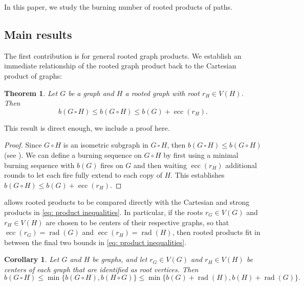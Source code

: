 \documentclass{article}
\newtheorem{theorem}{Theorem}
\newtheorem{corollary}{Corollary}
\begin{document}
In this paper, we study the burning number of rooted products of paths.



\subsection{Main results}
The first contribution is for general rooted graph products. We establish an immediate relationship of the rooted graph product back to the Cartesian product of graphs:

\begin{theorem}\label{thm: rooted ineq}
    Let $G$ be a graph and $H$ a rooted graph with root $r_H \in V(H)$. Then
    \[
    b(G \, \square \, H) \le b(G \circ H) \le b(G) + \operatorname{ecc}(r_H).
    \]
\end{theorem}

This result is direct enough, we include a proof here. 

\begin{proof}
    Since $G \circ H$ is an isometric subgraph in $G \, \square \, H$, then $b(G \, \square \, H) \le b(G \circ H)$ (see \cite{bonato2016burn}). We can define a burning sequence on $G \circ H$ by first using a minimal burning sequence with $b(G)$ fires on $G$ and then waiting $\operatorname{ecc}(r_H)$ additional rounds to let each fire fully extend to each copy of $H$. This establishes $b(G \circ H) \le b(G) + \operatorname{ecc}(r_H)$.
\end{proof}

 allows rooted products to be compared directly with the Cartesian and strong products in \eqref{eq: product inequalities}. 
In particular, if the roots $r_G \in V(G)$ and $r_H \in V(H)$ are chosen to be centers of their respective graphs, so that $\operatorname{ecc}(r_G)=\operatorname{rad}(G)$ and $\operatorname{ecc}(r_H)=\operatorname{rad}(H)$, then rooted products fit in between the final two bounds in \eqref{eq: product inequalities}.
\begin{corollary}
Let $G$ and $H$ be graphs, and let $r_G \in V(G)$ and $r_H \in V(H)$ be centers of each graph that are identified as root vertices. Then
\[
    b(G \, \square \, H) \le \min\{b(G \circ H),b(H \circ G)\} \le \min\{b(G) + \operatorname{rad}(H),b(H) + \operatorname{rad}(G)\}.
\] 
\end{corollary}

\end{document}
